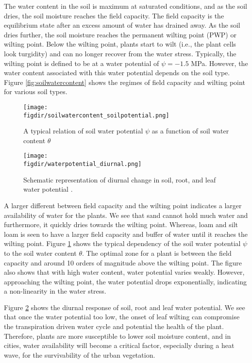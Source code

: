 The water content in the soil is maximum at saturated conditions, and as the soil dries, the soil moisture reaches the field capacity. The field capacity is the equilibrium state after an excess amount of water has drained away. As the soil dries further, the soil moisture reaches the permanent wilting point (PWP) or wilting point. Below the wilting point, plants start to wilt (i.e., the plant cells look turgidity) and can no longer recover from the water stress. Typically, the wilting point is defined to be at a water potential of $\psi=-1.5$ \si{\MPa}. However, the water content associated with this water potential depends on the soil type. Figure \ref{fig:soilwatercontent} shows the regimes of field capacity and wilting point for various soil types. 
	
	\begin{figure}[p]
		\centering
		\texttt{[image: \\figdir/soilwatercontent\_soilpotential.png]}
		\caption{A typical relation of soil water potential $\psi$ as a function of soil water content $\theta$ }
		\label{fig:soilwatercontent_soilpotential}
	\end{figure}
	
	\begin{figure}[p]
		\centering
		\texttt{[image: \\figdir/waterpotential\_diurnal.png]}
		\caption{Schematic representation  of diurnal change in soil, root, and leaf water potential \citep{nobel2009physicochemical}.}
		\label{fig:waterpotential_diurnal}
	\end{figure}	
	
A larger different between field capacity and the wilting point indicates a larger availability of water for the plants. We see that sand cannot hold much water and furthermore, it quickly dries towards the wilting point. Whereas, loam and silt loam is seen to have a larger field capacity and buffer of water until it reaches the wilting point. Figure \ref{fig:soilwatercontent_soilpotential} shows the typical dependency of the soil water potential $\psi$ to the soil water content $\theta$. The optimal zone for a plant is between the field capacity and around 10 orders of magnitude above the wilting point. The figure also shows that with high water content, water potential varies weakly. However, approaching the wilting point, the water potential drops exponentially, indicating a non-linearity in the water stress. 

Figure \ref{fig:waterpotential_diurnal} shows the diurnal response of soil, root and leaf water potential. We see that once the water potential too low, the onset of leaf wilting can compromise the transpiration driven water cycle and potential the health of the plant. Therefore, plants are more susceptible to lower soil moisture content, and in cities, water availability will become a critical factor, especially during a heat wave, for the survivability of the urban vegetation. 

